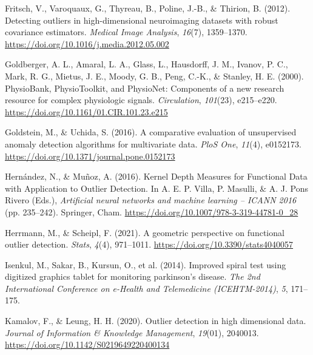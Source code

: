 \documentclass[
  10pt]{article}
\newlength{\cslhangindent}
\newlength{\cslentryspacingunit} %
\newenvironment{CSLReferences}[2] %
 {%
  \setlength{\parindent}{0pt}
  \ifodd #1
  \let\oldpar\par
  \def\par{\hangindent=\cslhangindent\oldpar}
  \fi
  \setlength{\parskip}{#2\cslentryspacingunit}
 }%
 {}
\begin{document}
\begin{CSLReferences}{1}{0}
\leavevmode{}%
Fritsch, V., Varoquaux, G., Thyreau, B., Poline, J.-B., \& Thirion, B. (2012). Detecting outliers in high-dimensional neuroimaging datasets with robust covariance estimators. \emph{Medical Image Analysis}, \emph{16}(7), 1359--1370. \url{https://doi.org/10.1016/j.media.2012.05.002}

\leavevmode{}%
Goldberger, A. L., Amaral, L. A., Glass, L., Hausdorff, J. M., Ivanov, P. C., Mark, R. G., Mietus, J. E., Moody, G. B., Peng, C.-K., \& Stanley, H. E. (2000). Physio{B}ank, {P}hysio{T}oolkit, and {P}hysio{N}et: Components of a new research resource for complex physiologic signals. \emph{Circulation}, \emph{101}(23), e215--e220. \url{https://doi.org/10.1161/01.CIR.101.23.e215}

\leavevmode{}%
Goldstein, M., \& Uchida, S. (2016). A comparative evaluation of unsupervised anomaly detection algorithms for multivariate data. \emph{PloS One}, \emph{11}(4), e0152173. \url{https://doi.org/10.1371/journal.pone.0152173}

\leavevmode{}%
Hernández, N., \& Muñoz, A. (2016). Kernel {D}epth {M}easures for {F}unctional {D}ata with {A}pplication to {O}utlier {D}etection. In A. E. P. Villa, P. Masulli, \& A. J. Pons Rivero (Eds.), \emph{Artificial neural networks and machine learning -- {ICANN} 2016} (pp. 235--242). Springer, Cham. \url{https://doi.org/10.1007/978-3-319-44781-0_28}

\leavevmode{}%
Herrmann, M., \& Scheipl, F. (2021). A geometric perspective on functional outlier detection. \emph{Stats}, \emph{4}(4), 971--1011. \url{https://doi.org/10.3390/stats4040057}

\leavevmode{}%
Isenkul, M., Sakar, B., Kursun, O., et al. (2014). Improved spiral test using digitized graphics tablet for monitoring parkinson's disease. \emph{The 2nd International Conference on e-Health and Telemedicine (ICEHTM-2014)}, \emph{5}, 171--175.

\leavevmode{}%
Kamalov, F., \& Leung, H. H. (2020). Outlier detection in high dimensional data. \emph{Journal of Information \& Knowledge Management}, \emph{19}(01), 2040013. \url{https://doi.org/10.1142/S0219649220400134}


\end{CSLReferences}
\end{document}

